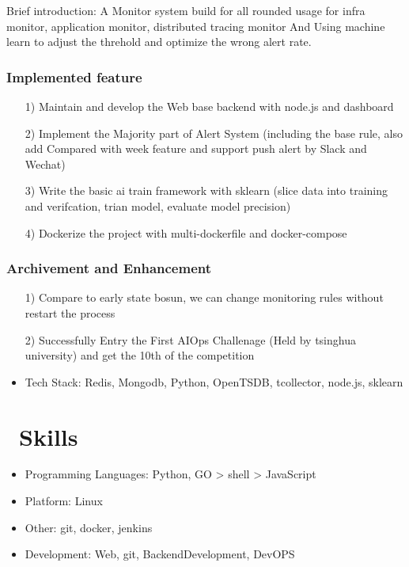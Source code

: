 \documentclass{resume}
\begin{document}
Brief introduction: A Monitor system build for all rounded usage for infra monitor, application monitor, distributed tracing monitor And Using machine learn to adjust the threhold and optimize the wrong alert rate.
    \subsubsection{\textbf {Implemented feature}}
    \begin{itemize}
        \item [1)]  
          Maintain and develop the Web base backend with node.js and dashboard 
        \item [2)]
          Implement the Majority part of Alert System (including the base rule, also add Compared with week feature and support push alert by Slack and Wechat)
        \item [3)]
          Write the basic ai train framework with sklearn (slice data into training and verifcation, trian model, evaluate model precision)
        \item [4)]
          Dockerize the project with multi-dockerfile and docker-compose 
    \end{itemize} 
    \subsubsection{\textbf {Archivement and Enhancement}}
    \begin{itemize}
        \item [1)]
        Compare to early state bosun, we can change monitoring rules without restart the process 
        \item [2)] 
        Successfully Entry the First AIOps Challenage (Held by tsinghua university) and get the 10th of the competition
    \end{itemize}
    \begin{itemize}
    \item Tech Stack: Redis, Mongodb, Python, OpenTSDB, tcollector, node.js, sklearn
    \end{itemize}


\section{\faCogs\ Skills}
\begin{itemize}[parsep=0.5ex]
  \item Programming Languages: Python, GO > shell > JavaScript
  \item Platform: Linux
  \item Other: git, docker, jenkins
  \item Development: Web, git, BackendDevelopment, DevOPS
\end{itemize}
\end{document}
